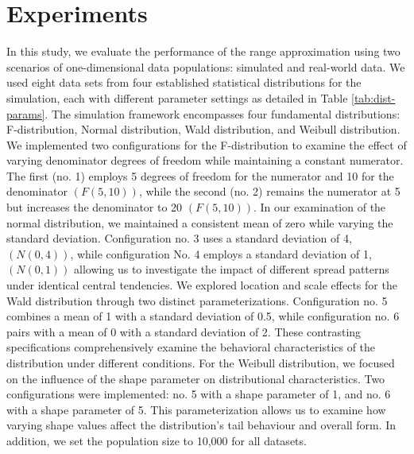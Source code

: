 \documentclass[lettersize,journal]{IEEEtran}
\begin{document}
\section{Experiments}
In this study, we evaluate the performance of the range approximation using two scenarios of one-dimensional data populations: simulated and real-world data. We used eight data sets from four established statistical distributions for the simulation, each with different parameter settings as detailed in Table \ref{tab:dist-params}. The simulation framework encompasses four fundamental distributions: F-distribution, Normal distribution, Wald distribution, and Weibull distribution. We implemented two configurations for the F-distribution to examine the effect of varying denominator degrees of freedom while maintaining a constant numerator. The first (no. 1) employs 5 degrees of freedom for the numerator and 10 for the denominator $\left(F(5,10)\right)$, while the second (no. 2) remains the numerator at 5 but increases the denominator to 20 $\left(F(5,10)\right)$. In our examination of the normal distribution, we maintained a consistent mean of zero while varying the standard deviation. Configuration no. 3 uses a standard deviation of 4, $\left(N(0,4)\right)$, while configuration No. 4 employs a standard deviation of 1, $\left(N(0,1)\right)$ allowing us to investigate the impact of different spread patterns under identical central tendencies. We explored location and scale effects for the Wald distribution through two distinct parameterizations. Configuration no. 5 combines a mean of 1 with a standard deviation of 0.5, while configuration no. 6 pairs with a mean of 0 with a standard deviation of 2. These contrasting specifications comprehensively examine the behavioral characteristics of the distribution under different conditions. For the Weibull distribution, we focused on the influence of the shape parameter on distributional characteristics. Two configurations were implemented: no. 5 with a shape parameter of 1, and no. 6 with a shape parameter of 5. This parameterization allows us to examine how varying shape values affect the distribution's tail behaviour and overall form. In addition, we set the population size to 10,000 for all datasets.  
\end{document}
